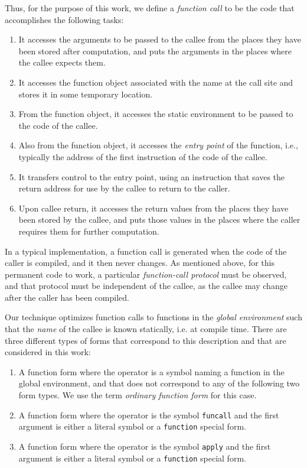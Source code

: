 Thus, for the purpose of this work, we define a \emph{function call}
to be the code that accomplishes the following tasks:

\begin{enumerate}
\item It accesses the arguments to be passed to the callee from the
  places they have been stored after computation, and puts the
  arguments in the places where the callee expects them.
\item It accesses the function object associated with the name at the
  call site and stores it in some temporary location.
\item From the function object, it accesses the static environment to
  be passed to the code of the callee.
\item Also from the function object, it accesses the \emph{entry
  point} of the function, i.e., typically the address of the first
  instruction of the code of the callee.
\item It transfers control to the entry point, using an instruction
  that saves the return address for use by the callee to return to the
  caller.
\item Upon callee return, it accesses the return values from the places
  they have been stored by the callee, and puts those values in the
  places where the caller requires them for further computation.
\end{enumerate}

In a typical implementation, a function call is generated when the
code of the caller is compiled, and it then never changes.  As
mentioned above, for this permanent code to work, a particular
\emph{function-call protocol} must be observed, and that protocol must
be independent of the callee, as the callee may change after the
caller has been compiled.

Our technique optimizes function calls to functions in the
\emph{global environment} such that the \emph{name} of the callee is
known statically, i.e. at compile time.  There are three different
types of forms that correspond to this description and that are
considered in this work:

\begin{enumerate}
\item A function form where the operator is a symbol naming a function
  in the global environment, and that does not correspond to any of
  the following two form types.  We use the term \emph{ordinary
    function form} for this case.
\item A function form where the operator is the symbol
  \texttt{funcall} and the first argument is either a literal symbol
  or a \texttt{function} special form.
\item A function form where the operator is the symbol
  \texttt{apply} and the first argument is either a literal symbol
  or a \texttt{function} special form.
\end{enumerate}

